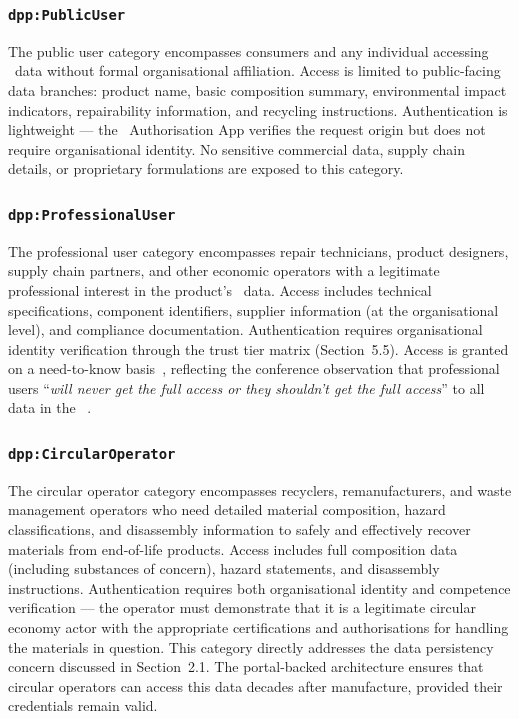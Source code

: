 \subsubsection{\texttt{dpp:PublicUser}}

The public user category encompasses consumers and any individual accessing
\DPP\ data without formal organisational affiliation. Access is limited to
public-facing data branches: product name, basic composition summary,
environmental impact indicators, repairability information, and recycling
instructions. Authentication is lightweight --- the \EC\ Authorisation App
verifies the request origin but does not require organisational identity. No
sensitive commercial data, supply chain details, or proprietary formulations are
exposed to this category.

\subsubsection{\texttt{dpp:ProfessionalUser}}

The professional user category encompasses repair technicians, product
designers, supply chain partners, and other economic operators with a legitimate
professional interest in the product's \DPP\ data. Access includes technical
specifications, component identifiers, supplier information (at the
organisational level), and compliance documentation. Authentication requires
organisational identity verification through the trust tier matrix
(Section~5.5). Access is granted on a need-to-know basis~\cite{dpp4eu2026_day1},
reflecting the conference observation that professional users ``\textit{will
never get the full access or they shouldn't get the full access}'' to all data
in the \DPP~\cite{dpp4eu2026_day1}.

\subsubsection{\texttt{dpp:CircularOperator}}

The circular operator category encompasses recyclers, remanufacturers, and waste
management operators who need detailed material composition, hazard
classifications, and disassembly information to safely and effectively recover
materials from end-of-life products. Access includes full composition data
(including substances of concern), hazard statements, and disassembly
instructions. Authentication requires both organisational identity and
competence verification --- the operator must demonstrate that it is a
legitimate circular economy actor with the appropriate certifications and
authorisations for handling the materials in question. This category directly
addresses the data persistency concern discussed in Section~2.1. The
portal-backed architecture ensures that circular operators can access this data
decades after manufacture, provided their credentials remain valid.

